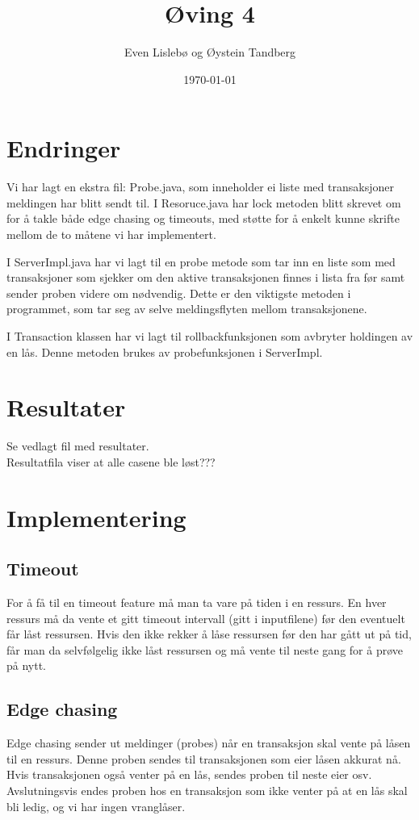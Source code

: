 \documentclass{article}
\begin{document}
\title{Øving 4}
\author{Even Lislebø og Øystein Tandberg}
\date{\today}
\maketitle

\section*{Endringer}
Vi har lagt en ekstra fil: Probe.java, som inneholder ei liste med transaksjoner meldingen har blitt sendt til.
I Resoruce.java har lock metoden blitt skrevet om for å takle både edge chasing og timeouts, med støtte for å enkelt kunne skrifte mellom de to måtene vi har implementert. 

I ServerImpl.java har vi lagt til en probe metode som tar inn en liste som med transaksjoner som sjekker om den aktive transaksjonen finnes i lista fra før samt sender proben videre om nødvendig. Dette er den viktigste metoden i programmet, som tar seg av selve meldingsflyten mellom transaksjonene.

I Transaction klassen har vi lagt til rollbackfunksjonen som avbryter holdingen av en lås. Denne metoden brukes av probefunksjonen i ServerImpl. 


\section*{Resultater}
Se vedlagt fil med resultater. \\ 
Resultatfila viser at alle casene ble løst???

\section*{Implementering}
\subsection*{Timeout}
For å få til en timeout feature må man ta vare på tiden i en ressurs. En hver ressurs må da vente et gitt timeout intervall (gitt i inputfilene) før den eventuelt får låst ressursen. Hvis den ikke rekker å låse ressursen før den har gått ut på tid, får man da selvfølgelig ikke låst ressursen og må vente til neste gang for å prøve på nytt.

\subsection*{Edge chasing}
Edge chasing sender ut meldinger (probes) når en transaksjon skal vente på låsen til en ressurs. Denne proben sendes til transaksjonen som eier låsen akkurat nå. Hvis transaksjonen også venter på en lås, sendes proben til neste eier osv. Avslutningsvis endes proben hos en transaksjon som ikke venter på at en lås skal bli ledig, og vi har ingen vranglåser.
\end{document}
